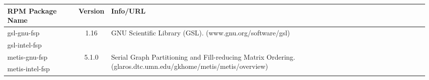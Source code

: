 \small
\begin{tabularx}{\textwidth}{l|c|X}
\toprule
{\bf RPM Package Name} & {\bf Version} & {\bf Info/URL}  \\ 
\midrule

gsl-gnu-fsp & 
\multirow{2}{*}{1.16} & 
\multirow{2}{\linewidth}{GNU Scientific Library (GSL). \newline (www.gnu.org/software/gsl)} \\ 
gsl-intel-fsp & 
& \\ 
\hline

metis-gnu-fsp & 
\multirow{2}{*}{5.1.0} & 
\multirow{2}{\linewidth}{Serial Graph Partitioning and Fill-reducing Matrix Ordering. \newline (glaros.dtc.umn.edu/gkhome/metis/metis/overview)} \\ 
metis-intel-fsp & 
& \\ 
\hline

\bottomrule
\end{tabularx}
